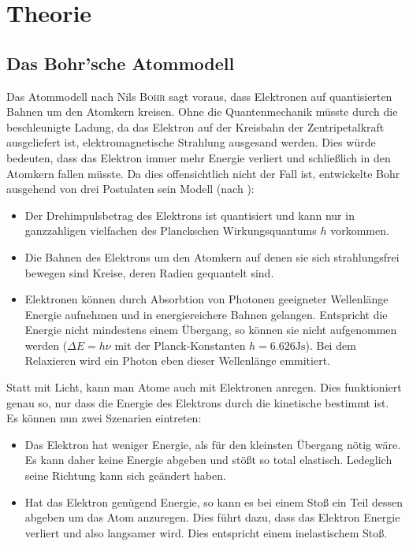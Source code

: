 \documentclass[12pt,a4paper,titlepage,headinclude,bibtotoc]{scrartcl}
\begin{document}
\section{Theorie}
\label{sec:theorie}
\subsection{Das Bohr'sche Atommodell}
Das Atommodell nach Nils \textsc{Bohr} sagt voraus, dass Elektronen auf quantisierten Bahnen um den Atomkern kreisen.
Ohne die Quantenmechanik müsste durch die beschleunigte Ladung, da das Elektron auf der Kreisbahn der Zentripetalkraft ausgeliefert ist, elektromagnetische Strahlung ausgesand werden.
Dies würde bedeuten, dass das Elektron immer mehr Energie verliert und schließlich in den Atomkern fallen müsste.
Da dies offensichtlich nicht der Fall ist, entwickelte Bohr ausgehend von drei Postulaten sein Modell (nach \cite[S. 110 f.]{demtroeder3}):
\begin{itemize}
\item Der Drehimpulsbetrag des Elektrons ist quantisiert und kann nur in ganzzahligen vielfachen des Planckschen Wirkungsquantums $h$ vorkommen.
\item Die Bahnen des Elektrons um den Atomkern auf denen sie sich strahlungsfrei bewegen sind Kreise, deren Radien gequantelt sind.
\item Elektronen können durch Absorbtion von Photonen geeigneter Wellenlänge Energie aufnehmen und in energiereichere Bahnen gelangen.
Entspricht die Energie nicht mindestens einem Übergang, so können sie nicht aufgenommen werden ($\Delta E=h\nu$ mit der Planck-Konstanten $h=6.626\si{\joule\second}$).
Bei dem Relaxieren wird ein Photon eben dieser Wellenlänge emmitiert.
\end{itemize}

Statt mit Licht, kann man Atome auch mit Elektronen anregen.
Dies funktioniert genau so, nur dass die Energie des Elektrons durch die kinetische bestimmt ist.
Es können nun zwei Szenarien eintreten:
\begin{itemize}
\item Das Elektron hat weniger Energie, als für den kleinsten Übergang nötig wäre.
Es kann daher keine Energie abgeben und stößt so total elastisch.
Ledeglich seine Richtung kann sich geändert haben.
\item Hat das Elektron genügend Energie, so kann es bei einem Stoß ein Teil dessen abgeben um das Atom anzuregen.
Dies führt dazu, dass das Elektron Energie verliert und also langsamer wird.
Dies entspricht einem inelastischem Stoß.
\end{itemize}
\end{document}
